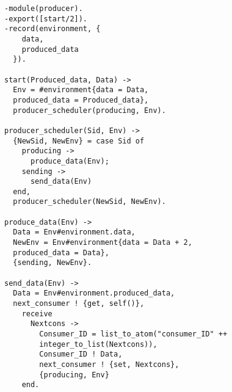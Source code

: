 
\begin{verbatim}
-module(producer).
-export([start/2]).
-record(environment, {
    data,
    produced_data
  }).

start(Produced_data, Data) ->
  Env = #environment{data = Data,
  produced_data = Produced_data},
  producer_scheduler(producing, Env).

producer_scheduler(Sid, Env) ->
  {NewSid, NewEnv} = case Sid of
    producing ->
      produce_data(Env);
    sending ->
      send_data(Env)
  end,
  producer_scheduler(NewSid, NewEnv).

produce_data(Env) ->
  Data = Env#environment.data,
  NewEnv = Env#environment{data = Data + 2,
  produced_data = Data},
  {sending, NewEnv}.
  
send_data(Env) ->
  Data = Env#environment.produced_data,
  next_consumer ! {get, self()},
    receive 
      Nextcons -> 
        Consumer_ID = list_to_atom("consumer_ID" ++
        integer_to_list(Nextcons)),
        Consumer_ID ! Data,
        next_consumer ! {set, Nextcons},
        {producing, Env}
    end.
\end{verbatim}

